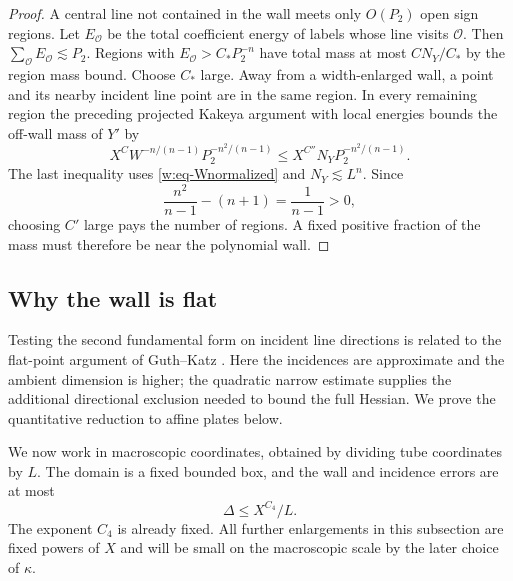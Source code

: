 \begin{proof}
A central line not contained in the wall meets only $O(P_2)$ open
sign regions.  Let $E_{\mathcal O}$ be the total coefficient energy of
labels whose line visits $\mathcal O$.  Then
$\sum_{\mathcal O}E_{\mathcal O}\lesssim P_2$.  Regions with
$E_{\mathcal O}>C_*P_2^{-n}$ have total mass at most $CN_Y/C_*$ by
the region mass bound.  Choose $C_*$ large.  Away from a width-enlarged
wall, a point and its nearby incident line point are in the same
region.  In every remaining region the preceding projected Kakeya
argument with local energies bounds the off-wall mass of $Y'$ by
\[
 X^CW^{-n/(n-1)}P_2^{-n^2/(n-1)}
 \leq X^{C''}N_YP_2^{-n^2/(n-1)}.
\]
The last inequality uses \eqref{w:eq-Wnormalized} and
$N_Y\lesssim L^n$.  Since
\[
 \frac{n^2}{n-1}-(n+1)=\frac1{n-1}>0,
\]
choosing $C'$ large pays the number of regions.  A fixed positive
fraction of the mass must therefore be near the polynomial wall.
\end{proof}

\subsection{Why the wall is flat}\label{w:curvature}

Testing the second fundamental form on incident line directions is
related to the flat-point argument of
Guth--Katz \citep[Lemma~3.3 and Corollary~3.4]{GuthKatz2010Algebraic}.
Here the incidences are approximate and the ambient dimension is higher;
the quadratic narrow estimate supplies the additional directional
exclusion needed to bound the full Hessian.  We prove the quantitative
reduction to affine plates below.

We now work in macroscopic coordinates, obtained by dividing tube
coordinates by $L$.  The domain is a fixed bounded box, and the wall
and incidence errors are at most
\begin{equation}\label{w:eq-Delta}
 \Delta\leq X^{C_4}/L.
\end{equation}
The exponent $C_4$ is already fixed.  All further enlargements in this
subsection are fixed powers of $X$ and will be small on the
macroscopic scale by the later choice of $\kappa$.

